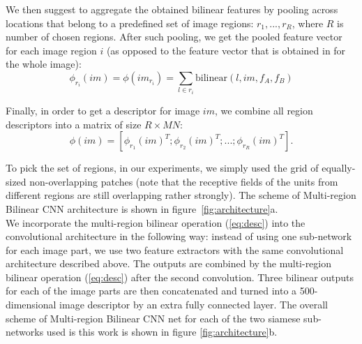 We then suggest to aggregate the obtained bilinear features by pooling across locations that belong to a predefined set of image regions:  ${r_{1}},  ..., {r_{R}}$, where $R$ is number of chosen regions.
After such pooling, we get the pooled feature vector for each image region $i$ (as opposed to the feature vector that is obtained in \citep{lin2015bilinear} for the whole image):
\begin{equation} \label{eq:bilinear_pooling}
\phi_{r_{i}}(im) = \phi(im_{r_{i}}) = \sum_{l \in r_{i}} \text{bilinear}(l, im, {f_{A}^{}}, {f_{B}^{}})
\end{equation}

Finally, in order to get a descriptor for image $im$, we combine all region descriptors into a matrix of size $R \times MN$:
\begin{equation} \label{eq:desc}
\phi(im) = [{\phi_{r_{1}}(im)}_{}^{T}; {\phi_{r_{2}}(im)}_{}^{T}; ... ; {\phi_{r_{R}}(im)}_{}^{T}]. 
\end{equation}





To pick the set of regions, in our experiments, we simply used the grid of equally-sized non-overlapping patches (note that the receptive fields of the units from different regions are still overlapping rather strongly). The scheme of Multi-region Bilinear CNN architecture is shown in figure~\ref{fig:architecture}a. \\
We incorporate the multi-region bilinear operation (\ref{eq:desc}) into the convolutional architecture in the following way: instead of using one sub-network for each image part, we use two feature extractors with the same convolutional architecture described above. The outputs are combined by the multi-region bilinear operation (\ref{eq:desc}) after the second convolution. Three bilinear outputs for each of the image parts are then concatenated and turned into a 500-dimensional image descriptor by an extra fully connected layer.  The overall scheme of Multi-region Bilinear CNN net for each of the two siamese sub-networks used is this work is shown in figure \ref{fig:architecture}b.


